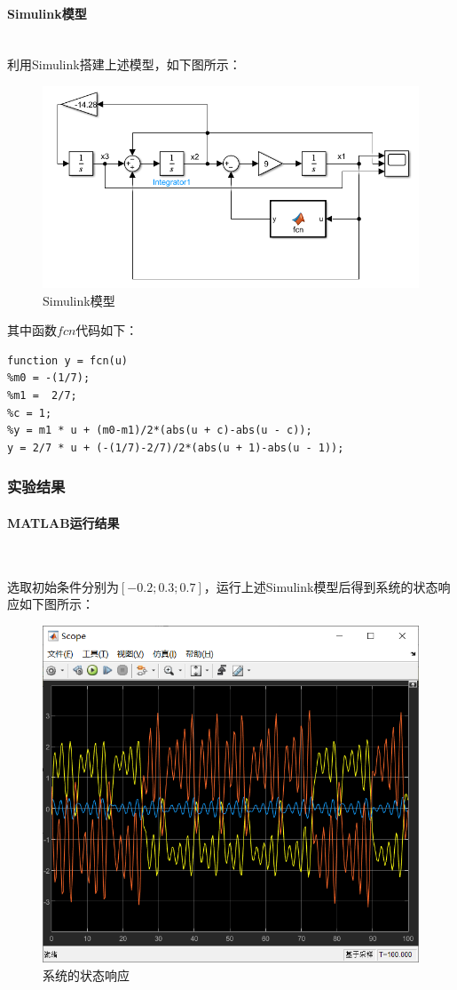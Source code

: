 \documentclass[UTF8]{article}
\begin{document}
\paragraph{Simulink模型}~{}
\\
利用Simulink搭建上述模型，如下图所示：
\begin{figure}[H]
    \centering %
    \includegraphics[width=.8\textwidth]{figure/exp1_2_model.png} 
    \caption{Simulink模型} %
\end{figure}
\noindent 其中函数$fcn$代码如下：
\begin{lstlisting}
function y = fcn(u)
%m0 = -(1/7);
%m1 =  2/7;
%c = 1;
%y = m1 * u + (m0-m1)/2*(abs(u + c)-abs(u - c));
y = 2/7 * u + (-(1/7)-2/7)/2*(abs(u + 1)-abs(u - 1));
\end{lstlisting}


\subsubsection{实验结果}
\paragraph{MATLAB运行结果}~{}

选取初始条件分别为$[-0.2; 0.3; 0.7]$，运行上述Simulink模型后得到系统的状态响应如下图所示：
\begin{figure}[H]
    \centering %
    \includegraphics[width=.8\textwidth]{figure/exp1_2_系统的状态响应.png} 
    \caption{系统的状态响应} %
\end{figure}
\end{document}
